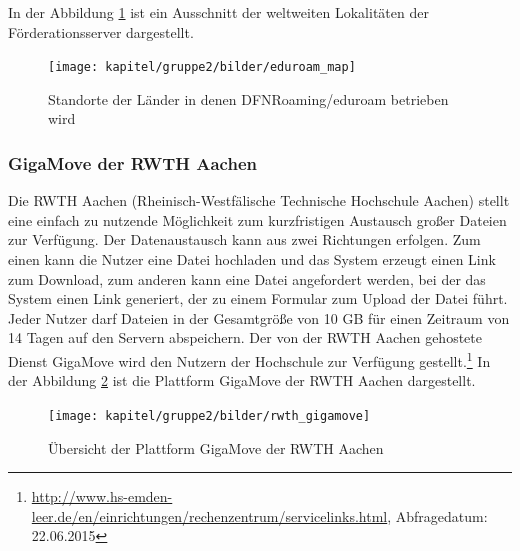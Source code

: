 In der Abbildung \ref{fig_map_eduroam} ist ein Ausschnitt der weltweiten Lokalitäten der Förderationsserver dargestellt.

\begin{figure}[h!]
	\centering
	\texttt{[image: kapitel/gruppe2/bilder/eduroam\_map]}
	\caption{Standorte der Länder in denen DFNRoaming/eduroam betrieben wird \protect\footnotemark}
	\label{fig_map_eduroam}
\end{figure}

\subsubsection{GigaMove der RWTH Aachen}
\label{gigamove_rwth_aachen}
Die RWTH Aachen (Rheinisch-Westfälische Technische Hochschule Aachen) stellt eine einfach zu nutzende Möglichkeit zum kurzfristigen Austausch großer Dateien zur Verfügung. Der Datenaustausch kann aus zwei Richtungen erfolgen. Zum einen kann die Nutzer eine Datei hochladen und das System erzeugt einen Link zum Download, zum anderen kann eine Datei angefordert werden, bei der das System einen Link generiert, der zu einem Formular zum Upload der Datei führt. Jeder Nutzer darf Dateien in der Gesamtgröße von 10 GB für einen Zeitraum von 14 Tagen auf den Servern abspeichern. Der von der RWTH Aachen gehostete Dienst GigaMove wird den Nutzern der Hochschule zur Verfügung gestellt.\footnote{\url{http://www.hs-emden-leer.de/en/einrichtungen/rechenzentrum/servicelinks.html}, Abfragedatum: 22.06.2015} In der Abbildung \ref{fig_rwth_gigamove} ist die Plattform GigaMove der RWTH Aachen dargestellt.

\begin{figure}
	\centering
	\texttt{[image: kapitel/gruppe2/bilder/rwth\_gigamove]}
	\caption{Übersicht der Plattform GigaMove der RWTH Aachen \protect\footnotemark}
	\label{fig_rwth_gigamove}
\end{figure}

